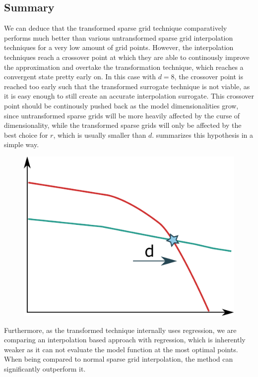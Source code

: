 \documentclass[
  a4paper,  %
  twoside,  %
  bibliography=totoc,
  headsepline,
  cleardoublepage=empty,
  parskip=half,
  draft=false
]{scrbook}
\begin{document}
\subsection{Summary}
We can deduce that the transformed sparse grid technique comparatively performs much better than various untransformed sparse grid interpolation techniques for a very low amount of grid points.
However, the interpolation techniques reach a crossover point at which they are able to continously improve the approximation and overtake the transformation technique, which reaches a convergent state pretty early on.
In this case with $d=8$, the crossover point is reached too early such that the transformed surrogate technique is not viable, as it is easy enough to still create an accurate interpolation surrogate.
This crossover point should be continously pushed back as the model dimensionalities grow, since untransformed sparse grids will be more heavily affected by the curse of dimensionality, while the transformed sparse grids will only be affected by the best choice for $r$, which is usually smaller than $d$.
 summarizes this hypothesis in a simple way.

\begin{mdframed}[style=style]
\begin{figure}[H]
        \centering
\begin{minipage}{0.49\textwidth}
        \centering
{}
\label{fig:trend}
    \end{minipage}%
    \begin{minipage}{0.49\textwidth}
        \centering
   \includegraphics[width=0.7\linewidth]{graphics/trend}
   \vspace{2mm}
    \end{minipage}
\end{figure}
\end{mdframed}
%
Furthermore, as the transformed technique internally uses regression, we are comparing an interpolation based approach with regression, which is inherently weaker as it can not evaluate the model function at the most optimal points.
When being compared to normal sparse grid interpolation, the method can significantly outperform it.
\end{document}
